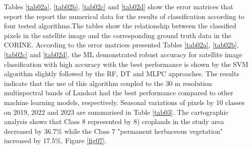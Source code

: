 \documentclass[jimaging,article,submit,pdftex,moreauthors]{Definitions/mdpi}
\begin{document}
Tables \ref{tab02a}, \ref{tab02b}, \ref{tab02c} and \ref{tab02d} show the error matrices that report the report the numerical data{ }for the results of classification according to four tested algorithms{.}The tables show the relationship between the classified pixels in the satellite image and the corresponding ground truth data in the CORINE{.} {According to the error matrices presented Tables} \ref{tab02a}, \ref{tab02b}, \ref{tab02c} and \ref{tab02d}, the ML demonstrated robust accuracy for satellite image classification with high accuracy with the best performance is shown by the SVM algorithm slightly followed by the RF, DT and MLPC approaches. {The results indicate that the use of this algorithm coupled to the 30 m resolution multispectral bands of Landsat had the best performance compared to other machine learning models, respectively. }{Seasonal} variations of pixels by 10 classes on 2019, 2022 and 2023 are summarised in Table \ref{tab03}. The cartographic analysis shows that Class 8 represented by 8) croplands in the study area decreased by 36.7\% while the Class 7 "permanent herbaceous vegetation" increased by 17.5\%, Figure \ref{fig07}. 
\end{document}
